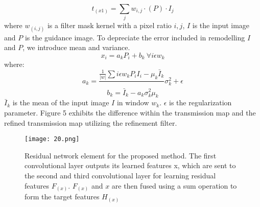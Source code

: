 \documentclass[doctor,english,listoffigures,listoftables]{thesis-uestc}
\begin{document}
\begin{equation}
t_{(x1)}=\sum_j w_{i,j} \cdot (P)\cdot I_j
\end{equation}
where $w_{(i,j)}$ is a filter mask kernel with a pixel ratio $i,j$, $I$ is the input image and $P$ is the guidance image. To depreciate the error included in remodelling $I$ and $P$, we introduce mean and variance.  
\begin{equation}
x_i=a_k P_i+b_k\ \forall i\epsilon w_k
\end{equation}
where:
\begin{equation}
a_k= \frac{\frac{1}{|w|} \sum i  \epsilon w_k P_i I_i -\mu_k \bar I_k}\, {\sigma_k^2  + \epsilon}
\end{equation}
\begin{equation}
b_k=  \bar I_k - a_k \sigma_k^2 \mu_k
\end{equation}
$\bar{I}_k $ is the mean of the input image $I$ in window $w_k$. $\epsilon$ is the regularization parameter. Figure 5 exhibits the difference within the transmission map and the refined transmission map utilizing the refinement filter.
\begin{figure}[H]
\begin{center}
\texttt{[image: 20.png]}
\caption{Residual network element for the proposed method. The first convolutional layer outputs its learned features x, which are sent to the second and third convolutional layer for learning residual features $F_{(x)}$. $F_{(x)}$ and $x$ are then fused using a sum operation to form the target features $H_{(x)}$}
\label{fig:6}
\end{center}
\end{figure} 
\end{document}
